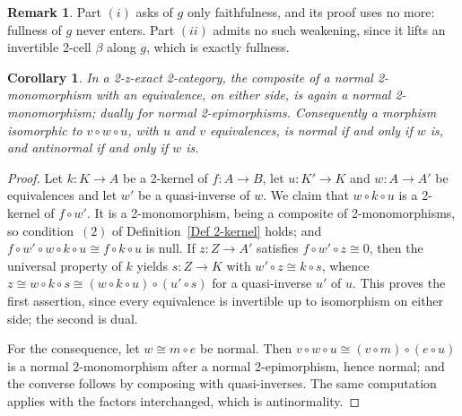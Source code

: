 \documentclass[reqno,a4paper]{amsart}
\numberwithin{equation}{section}
\theoremstyle{plain}
\newtheorem{corollary}[subsection]{Corollary}
\theoremstyle{definition}
\newtheorem{remark}[subsection]{Remark}
\def\nameit#1{\textrm{#1}~}
\def\defx{\nameit{Definition}}
\newcommand{\comp}{\circ}
\newcommand{\iso}{\cong}
\renewcommand{\1}{\onecat{1}}
\begin{document}
\begin{remark}\label{Rem Faithful Enough}
	Part \((i)\) asks of \(g\) only faithfulness, and its proof uses no more: fullness of \(g\) never enters. Part \((ii)\) admits no such weakening, since it lifts an invertible 2-cell \(\beta\) along \(g\), which is exactly fullness.
\end{remark}

\begin{corollary}\label{C:NormalTransport}
	In a 2-z-exact 2-category, the composite of a normal 2-monomorphism with an equivalence, on either side, is again a normal 2-monomorphism; dually for normal 2-epimorphisms. Consequently a morphism isomorphic to \(v\comp w\comp u\), with \(u\) and \(v\) equivalences, is normal if and only if \(w\) is, and antinormal if and only if \(w\) is.
\end{corollary}
\begin{proof}
	Let \(k\colon K\to A\) be a 2-kernel of \(f\colon A\to B\), let \(u\colon K'\to K\) and \(w\colon A\to A'\) be equivalences and let \(w'\) be a quasi-inverse of \(w\). We claim that \(w\comp k\comp u\) is a 2-kernel of \(f\comp w'\). It is a 2-monomorphism, being a composite of 2-monomorphisms, so condition~\((2)\) of \defx\ref{Def 2-kernel} holds; and \(f\comp w'\comp w\comp k\comp u\iso f\comp k\comp u\) is null. If \(z\colon Z\to A'\) satisfies \(f\comp w'\comp z\iso 0\), then the universal property of \(k\) yields \(s\colon Z\to K\) with \(w'\comp z\iso k\comp s\), whence \(z\iso w\comp k\comp s\iso(w\comp k\comp u)\comp(u'\comp s)\) for a quasi-inverse \(u'\) of \(u\). This proves the first assertion, since every equivalence is invertible up to isomorphism on either side; the second is dual.

	For the consequence, let \(w\iso m\comp e\) be normal. Then \(v\comp w\comp u\iso(v\comp m)\comp(e\comp u)\) is a normal 2-monomorphism after a normal 2-epimorphism, hence normal; and the converse follows by composing with quasi-inverses. The same computation applies with the factors interchanged, which is antinormality.
\end{proof}
\end{document}
